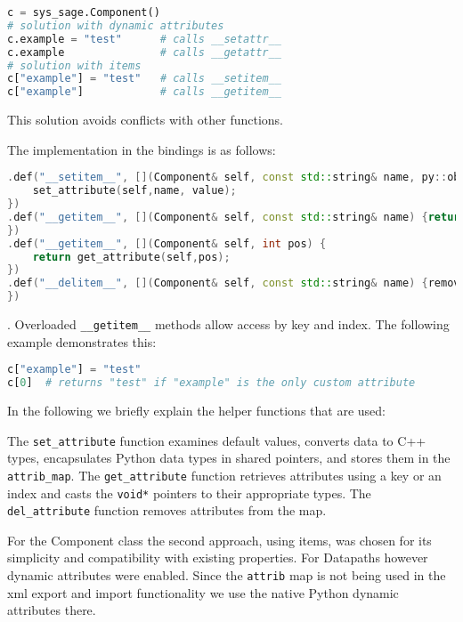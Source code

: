 \begin{lstlisting}[language=Python, xleftmargin=4em, frame = single]
c = sys_sage.Component()
# solution with dynamic attributes
c.example = "test"      # calls __setattr__
c.example               # calls __getattr__
# solution with items
c["example"] = "test"   # calls __setitem__
c["example"]            # calls __getitem__
\end{lstlisting}

This solution avoids conflicts with other functions.

The implementation in the bindings is as follows:

\begin{lstlisting}[language=C++, xleftmargin=4em, frame = single]
.def("__setitem__", [](Component& self, const std::string& name, py::object value) {
    set_attribute(self,name, value);
})
.def("__getitem__", [](Component& self, const std::string& name) {return get_attribute(self,name);
})
.def("__getitem__", [](Component& self, int pos) {
    return get_attribute(self,pos);
})
.def("__delitem__", [](Component& self, const std::string& name) {remove_attribute(self,name);
})
\end{lstlisting}

. Overloaded \verb|__getitem__| methods allow access by key and index. The following example demonstrates this:

\begin{lstlisting}[language=Python, xleftmargin=4em, frame = single]
c["example"] = "test"
c[0]  # returns "test" if "example" is the only custom attribute
\end{lstlisting}

In the following we briefly explain the helper functions that are used:

The \verb|set_attribute| function examines default values, converts data to C++ types, encapsulates Python data types in shared pointers, and stores them in the \verb|attrib_map|. The \verb|get_attribute| function retrieves attributes using a key or an index and casts the \verb|void*| pointers to their appropriate types. The \verb|del_attribute| function removes attributes from the map.

For the Component class the second approach, using items, was chosen for its simplicity and compatibility with existing properties. For Datapaths however dynamic attributes were enabled. Since the \verb|attrib| map is not being used in the xml export and import functionality we use the native Python dynamic attributes there.

